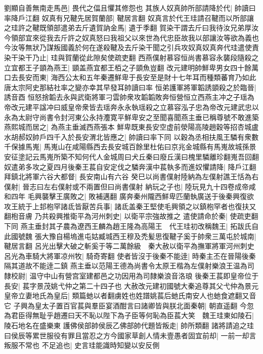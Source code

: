 劉顯自善無南走馬邑|{
	畏代之偪且懼其修怨也}
其族人奴真帥所部請降於代|{
	帥讀曰率降戶江翻}
奴真有兄鞬先居賀蘭部|{
	鞬居言翻}
奴真言於代王珪請召鞬而以所部讓之珪許之鞬既領部遣弟去斤遺賀訥金馬|{
	遺于季翻}
賀染干謂去斤曰我待汝兄弟厚汝今領部宜來從我去斤許之奴真怒曰我祖父以來世為代忠臣故我以部讓汝等欲為義也今汝等無狀乃謀叛國義於何在遂殺鞬及去斤染干聞之引兵攻奴真奴真奔代珪遣使責染干染干乃止|{
	珪與賀蘭從此隙矣使疏吏翻}
西燕僕射慕容恒尚書慕容永襲段隨殺之立宜都王子顗為燕王|{
	顗盖燕宜都王栢之子顗魚豈翻}
改元建明帥鮮卑男女四十餘萬口去長安而東|{
	海西公太和五年秦遷鮮卑于長安至是財十七年耳而種類蕃育乃如此唐太宗阿史那結社率之變亦幸其早發耳帥讀曰率}
恒弟護軍將軍韜誘顗殺之於臨晉|{
	誘音酉}
恒怒捨韜去永與武衛將軍刁雲帥衆攻韜韜敗奔恒營恒立西燕主冲之子瑶為帝改元建平諡冲曰威皇帝衆皆去瑶奔永永執瑶殺之立慕容泓子忠為帝改元建武忠以永為太尉守尚書令封河東公永持灋寛平鮮卑安之至聞喜聞燕主垂已稱尊號不敢進築燕熙城而居之|{
	為燕主垂滅西燕張本}
鮮卑既東長安空虚前滎陽高陵趙穀等招杏城盧水胡郝奴帥戶四千入於長安渭北皆應之|{
	帥讀曰率下同}
以穀為丞相扶風王驎有衆數千保據馬嵬|{
	馬嵬山在咸陽縣西去長安城百餘里杜佑曰京兆金城縣有馬嵬故城孫景安征塗記云馬嵬所築不知何代人金城周曰犬丘秦曰廢丘漢曰槐里驎離珍翻嵬吾回翻}
奴遣弟多攻之夏四月後秦王萇自安定伐之驎奔漢中萇執多而進奴懼請降|{
	降戶江翻}
拜鎮北將軍六谷大都督|{
	長安南山有六谷}
癸巳以尚書僕射陸納為左僕射譙王恬為右僕射|{
	晉志曰左右僕射或不兩置但曰尚書僕射}
納玩之子也|{
	陸玩見九十四卷成帝咸和四年}
毛興襲擊王廣敗之|{
	敗補邁翻}
廣奔秦州隴西鮮卑匹蘭執廣送于後秦興復欲攻王統于上邽枹罕諸氐皆厭苦兵事|{
	諸氐盖秦王堅使毛興領之以鎮枹罕者也復扶又翻枹音膚}
乃共殺興推衛平為河州刺史|{
	以衛平宗強故推之}
遣使請命於秦|{
	使疏吏翻下同}
燕主垂封其子農為遼西王麟為趙王隆為高陽王　代王珪初改稱魏王|{
	拓跋氏自此國號魏}
張大豫自楊塢進屯姑臧城西王穆及禿髪思復鞬子奚于帥衆三萬屯於城南|{
	鞬居言翻}
呂光出擊大破之斬奚于等二萬餘級　秦大赦以衛平為撫軍將軍河州刺史呂光為車騎大將軍凉州牧|{
	騎奇寄翻}
使者皆沒于後秦不能逹|{
	時秦主丕在晉陽後秦隔其道故不能逹二鎮}
燕主垂以范陽王德為尚書令太原王楷為左僕射樂浪王温為司隸校尉|{
	温守中山有營宫室建都邑之功因用為司隸樂浪音洛琅}
後秦王萇即皇帝位于長安|{
	萇字景茂姚弋仲之第二十四子也}
大赦改元建初國號大秦追尊其父弋仲為景元皇帝立妻地氏為皇后|{
	類篇虵以者翻虜姓也姓譜姚萇后虵氏南安人也虵食遮翻又音它}
子興為皇太子置百官萇與羣臣宴酒酣言曰諸卿皆與朕北面秦朝|{
	朝直遥翻}
今忽為君臣得無耻乎趙遷曰天不恥以陛下為子臣等何恥為臣萇大笑　魏王珪東如陵石|{
	陵石地名在盛樂東}
護佛侯部帥侯辰乙佛部帥代題皆叛走|{
	帥所類翻}
諸將請追之珪曰侯辰等累世服役有罪且當忍之方今國家草創人情未壹愚者固宜前却|{
	一前一却言叛服不常也}
不足追也|{
	史言珪能識時知變以安反側}
